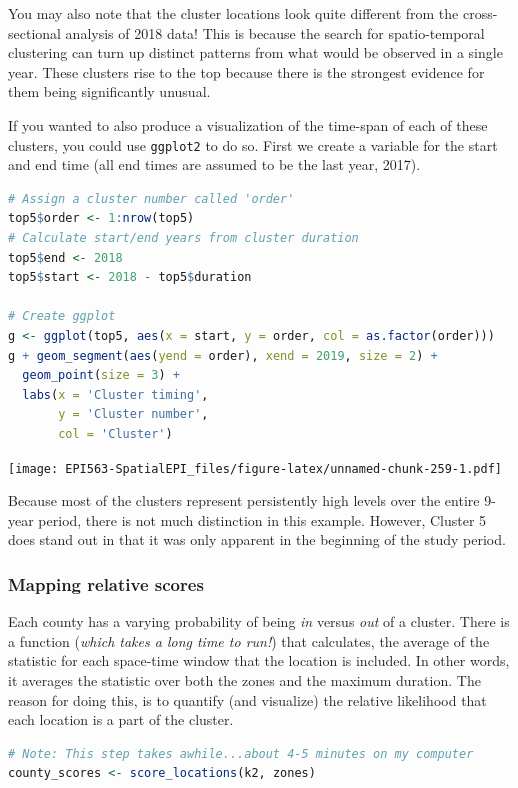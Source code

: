 \documentclass[
]{book}
\newcommand{\passthrough}[1]{#1}
\begin{document}
You may also note that the cluster locations look quite different from the cross-sectional analysis of 2018 data! This is because the search for spatio-temporal clustering can turn up distinct patterns from what would be observed in a single year. These clusters rise to the top because there is the strongest evidence for them being significantly unusual.

If you wanted to also produce a visualization of the time-span of each of these clusters, you could use \passthrough{\lstinline!ggplot2!} to do so. First we create a variable for the start and end time (all end times are assumed to be the last year, 2017).

\begin{lstlisting}[language=R]
# Assign a cluster number called 'order'
top5$order <- 1:nrow(top5)
# Calculate start/end years from cluster duration
top5$end <- 2018
top5$start <- 2018 - top5$duration

# Create ggplot
g <- ggplot(top5, aes(x = start, y = order, col = as.factor(order)))
g + geom_segment(aes(yend = order), xend = 2019, size = 2) + 
  geom_point(size = 3) + 
  labs(x = 'Cluster timing',
       y = 'Cluster number',
       col = 'Cluster') 
\end{lstlisting}

\texttt{[image: EPI563-SpatialEPI\_files/figure-latex/unnamed-chunk-259-1.pdf]}

Because most of the clusters represent persistently high levels over the entire 9-year period, there is not much distinction in this example. However, Cluster 5 does stand out in that it was only apparent in the beginning of the study period.

\hypertarget{mapping-relative-scores}{%
\subsubsection{Mapping relative scores}\label{mapping-relative-scores}}

Each county has a varying probability of being \emph{in} versus \emph{out} of a cluster. There is a function (\emph{which takes a long time to run!}) that calculates, the average of the statistic for each space-time window that the location is included. In other words, it averages the statistic over both the zones and the maximum duration. The reason for doing this, is to quantify (and visualize) the relative likelihood that each location is a part of the cluster.

\begin{lstlisting}[language=R]
# Note: This step takes awhile...about 4-5 minutes on my computer
county_scores <- score_locations(k2, zones)
\end{lstlisting}
\end{document}
